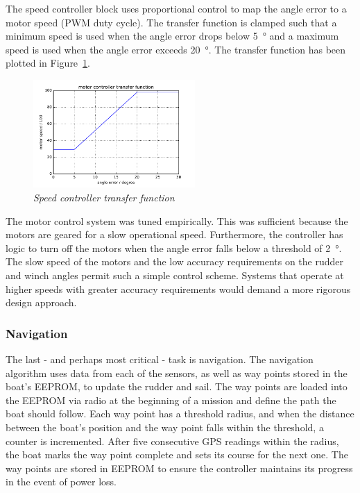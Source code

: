 \documentclass[12pt]{article}
\begin{document}
The speed controller block uses proportional control to map the angle error to a motor speed (PWM duty cycle). The transfer function is clamped such that a minimum speed is used when the angle error drops below \SI{5}{\degree} and a maximum speed is used when the angle error exceeds \SI{20}{\degree}. The transfer function has been plotted in Figure~\ref{fig:controller_transfer}.

\begin{figure}
	\centering
	\includegraphics[width=0.55\textwidth]{figures/p_control.pdf}
	\caption[Speed controller transfer function]{\textsl{Speed controller transfer function}}
	\label{fig:controller_transfer}
\end{figure}

The motor control system was tuned empirically. This was sufficient because the motors are geared for a slow operational speed. Furthermore, the controller has logic to turn off the motors when the angle error falls below a  threshold of \SI{2}{\degree}. The slow speed of the motors and the low accuracy requirements on the rudder and winch angles permit such a simple control scheme. Systems that operate at higher speeds with greater accuracy requirements would demand a more rigorous design approach.

\subsubsection{Navigation}
\label{subsubsec:nav}
The last - and perhaps most critical - task is navigation. The navigation algorithm uses data from each of the sensors, as well as way points stored in the boat's EEPROM, to update the rudder and sail. The way points are loaded into the EEPROM via radio at the beginning of a mission and define the path the boat should follow. Each way point has a threshold radius, and when the distance between the boat's position and the way point falls within the threshold, a counter is incremented. After five consecutive GPS readings within the radius, the boat marks the way point complete and sets its course for the next one. The way points are stored in EEPROM to ensure the controller maintains its progress in the event of power loss.
\end{document}
